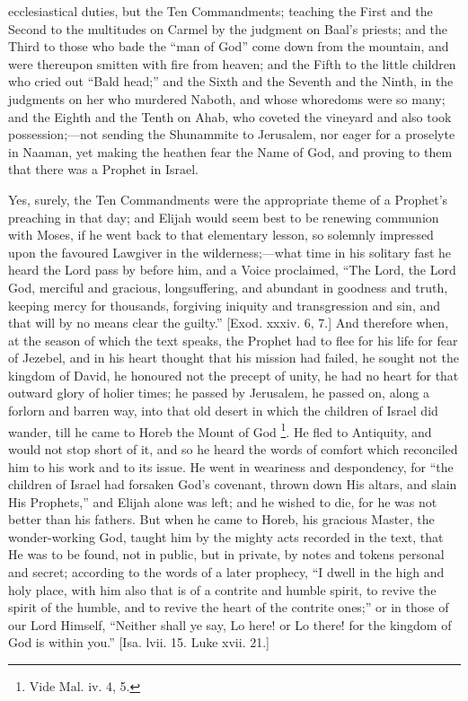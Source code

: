 ecclesiastical duties, but the Ten Commandments; teaching the First
and the Second to the multitudes on Carmel by the judgment on Baal's
priests; and the Third to those who bade the ``man of God''
come down from the mountain, and were thereupon smitten with fire from
heaven; and the Fifth to the little children who cried out ``Bald
head;'' and the Sixth and the Seventh and the Ninth, in the
judgments on her who murdered Naboth, and whose whoredoms were so
many; and the Eighth and the Tenth on Ahab, who coveted the vineyard
and also took possession;—not sending the Shunammite to Jerusalem,
nor eager for a proselyte in Naaman, yet making the heathen fear the
Name of God, and proving to them that there was a Prophet in Israel.

Yes, surely, the Ten Commandments were the appropriate theme of a
Prophet's preaching in that day; and Elijah would seem best to be
renewing communion with Moses, if he went back to that elementary
lesson, so solemnly impressed upon the favoured Lawgiver in the
wilderness;—what time in his solitary fast he heard the Lord pass by
before him, and a Voice proclaimed, ``The Lord, the Lord God,
merciful and gracious, longsuffering, and abundant in goodness and
truth, keeping mercy for thousands, forgiving iniquity and
transgression and sin, and that will by no means clear the
guilty.'' [Exod. xxxiv. 6, 7.] And therefore when, at the season
of which the text speaks, the Prophet had to flee for his life for
fear of Jezebel, and in his heart thought that his mission had failed,
he sought not the kingdom of David, he honoured not the precept of
unity, he had no heart for that outward glory of holier times; he
passed by Jerusalem, he passed on, along a forlorn and barren way,
into that old desert in which the children of Israel did wander, till
he came to Horeb the Mount of God \footnote{Vide Mal. iv. 4, 5.}. He fled to
Antiquity, and would not stop short of it, and so he heard the words
of comfort which reconciled him to his work and to its issue. He went
in weariness and despondency, for ``the children of Israel had
forsaken God's covenant, thrown down His altars, and slain His Prophets,'' and Elijah alone was left; and he wished to die, for
he was not better than his fathers. But when he came to Horeb, his
gracious Master, the wonder-working God, taught him by the mighty acts
recorded in the text, that He was to be found, not in public, but in
private, by notes and tokens personal and secret; according to the
words of a later prophecy, ``I dwell in the high and holy place,
with him also that is of a contrite and humble spirit, to revive the
spirit of the humble, and to revive the heart of the contrite
ones;'' or in those of our Lord Himself, ``Neither shall ye
say, Lo here! or Lo there! for the kingdom of God is within you.''
[Isa. lvii. 15. Luke xvii. 21.]

